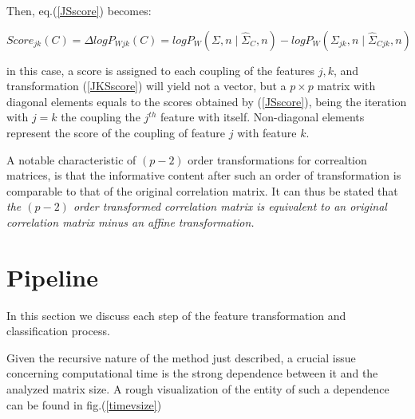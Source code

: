 \documentclass[12pt,openright,twoside,a4paper]{book}
\begin{document}
Then, eq.(\ref{JSscore}) becomes:

\begin{equation}
Score_{jk}(C)=\Delta logP_{Wjk}(C)=logP_W(\Sigma, n \mid \hat{\Sigma}_C,n)-logP_W(\Sigma_{jk}, n \mid \hat{\Sigma}_{Cjk},n)
\label{JKSscore}
\end{equation}
\vspace{5mm}

in this case, a score is assigned to each coupling of the features $j,k$, and transformation (\ref{JKSscore}) will yield not a vector, but a $p\times p$ matrix with diagonal elements equals to the scores obtained by (\ref{JSscore}), being the iteration with $j=k$ the coupling the $j^{th}$ feature with itself. 
Non-diagonal elements represent the score of the coupling of feature $j$ with feature $k$.

A notable characteristic of $(p-2)$ order transformations for correaltion matrices, is that the informative content after such an order of transformation is comparable to that of the original correlation matrix.
It can thus be stated that \textit{the $(p-2)$ order transformed correlation matrix is equivalent to an original correlation matrix minus an affine transformation.}


\section{Pipeline}

In this section we discuss each step of the feature transformation and classification process.

Given the recursive nature of the method just described, a crucial issue concerning computational time is the strong dependence between it and the analyzed matrix size.
A rough visualization of the entity of  such a dependence can be found in fig.(\ref{timevsize})
\end{document}
